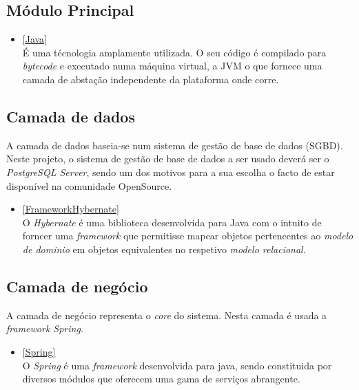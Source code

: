 \documentclass{article}
\begin{document}
\hypertarget{_m_dulo_principal_2}{%
\subsection{Módulo Principal}\label{_m_dulo_principal_2}}

\begin{itemize}
\item
  \protect\hyperlink{Java}{{[}Java{]}}\\
  É uma técnologia amplamente utilizada. O seu código é compilado para
  \emph{bytecode} e executado numa máquina virtual, a JVM o que fornece
  uma camada de abstação independente da plataforma onde corre.
\end{itemize}

\hypertarget{_camada_de_dados}{%
\subsection{Camada de dados}\label{_camada_de_dados}}

A camada de dados baseia-se num sistema de gestão de base de dados
(SGBD). Neste projeto, o sistema de gestão de base de dados a ser usado
deverá ser o \emph{PostgreSQL Server}, sendo um dos motivos para a sua
escolha o facto de estar disponível na comunidade OpenSource.\\

\begin{itemize}
\item
  \protect\hyperlink{FrameworkHybernate}{{[}FrameworkHybernate{]}}\\
  O \emph{Hybernate} é uma biblioteca desenvolvida para Java com o
  intuito de forncer uma \emph{framework} que permitisse mapear objetos
  pertencentes ao \emph{modelo de dominio} em objetos equivalentes no
  respetivo \emph{modelo relacional}.
\end{itemize}

\hypertarget{_camada_de_neg_cio}{%
\subsection{Camada de negócio}\label{_camada_de_neg_cio}}

A camada de negócio representa o \emph{core} do sistema. Nesta camada é
usada a \emph{framework Spring}.

\begin{itemize}
\item
  \protect\hyperlink{Spring}{{[}Spring{]}}\\
  O \emph{Spring} é uma \emph{framework} desenvolvida para java, sendo
  constituida por diversos módulos que oferecem uma gama de serviços
  abrangente.
\end{itemize}
\end{document}

